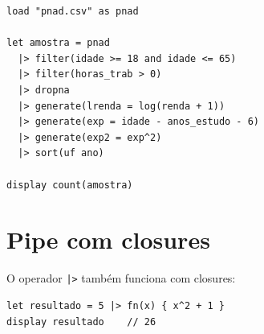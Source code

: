 \begin{lstlisting}[caption={Pipeline completo de preparação}]
load "pnad.csv" as pnad

let amostra = pnad
  |> filter(idade >= 18 and idade <= 65)
  |> filter(horas_trab > 0)
  |> dropna
  |> generate(lrenda = log(renda + 1))
  |> generate(exp = idade - anos_estudo - 6)
  |> generate(exp2 = exp^2)
  |> sort(uf ano)

display count(amostra)
\end{lstlisting}

\section{Pipe com closures}

O operador \lstinline{|>} também funciona com closures:

\begin{lstlisting}
let resultado = 5 |> fn(x) { x^2 + 1 }
display resultado    // 26
\end{lstlisting}
